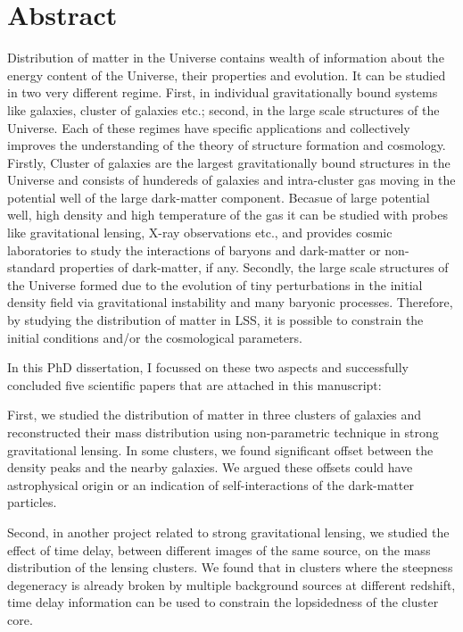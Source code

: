 {}


\chapter*{Abstract}

Distribution of matter in the Universe contains wealth of information about 
the energy content of the Universe, their properties and evolution. It can 
be studied in two very different regime. First, in individual gravitationally 
bound systems like galaxies, cluster of galaxies etc.; second, in the 
large scale structures of the Universe. Each of these regimes have specific
applications and collectively improves the understanding of the theory of 
structure formation and cosmology.  Firstly, Cluster of galaxies are
the largest gravitationally bound structures in the Universe and consists
of hundereds of galaxies and intra-cluster gas moving in the potential well 
of the large dark-matter component. Becasue of large potential well, high 
density and high temperature of the gas it can be studied with probes like 
gravitational lensing, X-ray observations etc., and provides cosmic 
laboratories to study the interactions of baryons and dark-matter or
non-standard properties of dark-matter, if any.
Secondly, the large scale structures of the Universe formed due to the evolution 
of tiny perturbations in the initial density field via gravitational 
instability and many baryonic processes. Therefore, by studying the 
distribution of matter in LSS, it is possible to constrain the initial
conditions and/or the cosmological parameters. 

In this PhD dissertation, I focussed on these two aspects and successfully 
concluded five scientific papers that are attached in this manuscript:

First, we studied the distribution of matter in three clusters of galaxies
and reconstructed their mass distribution using non-parametric technique in 
strong gravitational lensing. In some clusters, we found significant offset
between the density peaks and the nearby galaxies. We argued these offsets
could have astrophysical origin or an indication of self-interactions
of the dark-matter particles.

Second, in another project related to strong gravitational lensing, we studied
the effect of time delay, between different images of the same source,
on the mass distribution of the lensing clusters. We found that in clusters
where the steepness degeneracy is already broken by multiple background sources
at different redshift, time delay information can be used to constrain
the lopsidedness of the cluster core.

